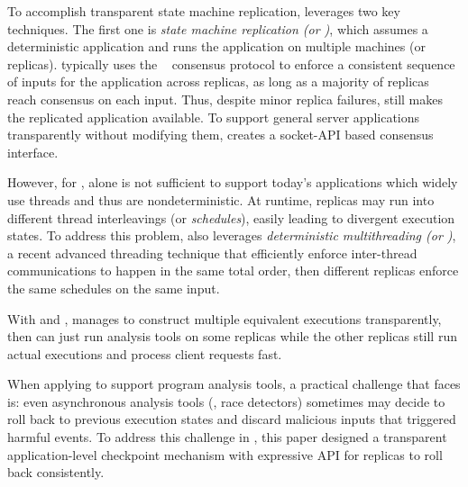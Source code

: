To accomplish transparent state machine replication, \repbox leverages two key 
techniques. The first one is \emph{state machine replication (or \smr)}, which assumes a deterministic 
application and runs the application on multiple machines (or replicas). \smr 
typically uses the \paxos~\cite{paxos} consensus protocol to enforce a 
consistent sequence of inputs for the application across replicas, as long as a 
majority of replicas reach consensus on each input. Thus, despite minor replica 
failures, \smr still makes the replicated application available. To support general server 
 applications transparently without modifying 
them, \repbox creates a socket-API based \paxos consensus interface.


However, for \repbox, \smr alone is not sufficient to support today's 
applications which widely use threads and thus are nondeterministic. At runtime, 
replicas may run into different thread interleavings (or \emph{schedules}), 
easily leading to divergent execution states. To address this problem, \repbox 
also leverages \emph{deterministic multithreading (or \dmt)}, a recent advanced 
threading technique that efficiently enforce inter-thread communications to 
happen in the same total order, then different replicas enforce the same schedules 
on the same input.

With \smr and \dmt, \repbox manages to construct multiple equivalent executions 
transparently, then \xxx can just run analysis tools on some replicas while the other replicas 
still run actual executions and process client requests fast.


When applying \repbox to support program analysis tools, a practical challenge that \xxx 
faces is: even asynchronous analysis tools (\eg, race detectors) 
sometimes may decide to roll back to previous execution states and discard 
malicious inputs that triggered harmful events. To address this challenge in 
\xxx, this paper designed a transparent application-level checkpoint mechanism 
with expressive API for replicas to roll back consistently.



